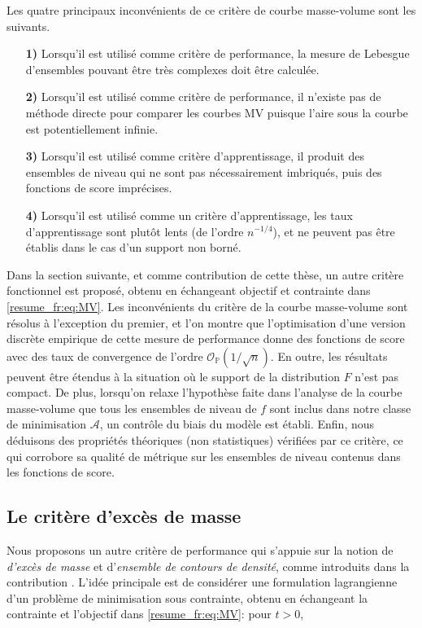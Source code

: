 \documentclass[a4paper, 12pt]{article}
\begin{document}
Les quatre principaux inconvénients de ce critère de courbe masse-volume sont les suivants.

\begin{itemize}
\item[\textbf{1)}] Lorsqu'il est utilisé comme critère de performance, la mesure de Lebesgue d'ensembles pouvant être très complexes doit être calculée.
\item[\textbf{2)}] Lorsqu'il est utilisé comme critère de performance, il n'existe pas de méthode directe pour comparer les courbes MV puisque l'aire sous la courbe est potentiellement infinie.
\item[\textbf{3)}] Lorsqu'il est utilisé comme critère d'apprentissage, il produit des ensembles de niveau qui ne sont pas nécessairement imbriqués, puis des fonctions de score imprécises.
\item[\textbf{4)}] Lorsqu'il est utilisé comme un critère d'apprentissage, les taux d'apprentissage sont plutôt lents (de l'ordre $ n ^ {- 1/4} $), et ne peuvent pas être établis dans le cas d'un support non borné.
\end{itemize}




Dans la section suivante, et comme contribution de cette thèse, un autre critère fonctionnel est proposé, obtenu en échangeant objectif et contrainte dans \eqref{resume_fr:eq:MV}. Les inconvénients du critère de la courbe masse-volume sont résolus à l'exception du premier, et l'on montre que l'optimisation d'une version discrète empirique de cette mesure de performance donne des fonctions de score avec des taux de convergence de l'ordre $ \mathcal {O} _ {\mathbb {P}} (1 / \sqrt {n}) $. En outre, les résultats peuvent être étendus à la situation où le support de la distribution $ F $ n'est pas compact. De plus, lorsqu'on relaxe l'hypothèse faite dans l'analyse de la courbe masse-volume que tous les ensembles de niveau de $f$ sont inclus dans notre classe de minimisation $ \mathcal {A} $, un contrôle du biais du modèle est établi. Enfin, nous déduisons des propriétés théoriques (non statistiques) vérifiées par ce critère, ce qui corrobore sa qualité de métrique sur les ensembles de niveau contenus dans les fonctions de score.


\subsection{Le critère d'excès de masse}
\label{resume_fr:em-curve}
Nous proposons un autre critère de performance qui s'appuie sur la notion de \textit {d'excès de masse} et d'\textit{ensemble de contours de densité}, comme introduits dans la contribution \cite{Polonik95}. L'idée principale est de considérer une formulation lagrangienne d'un problème de minimisation sous contrainte, obtenu en échangeant la contrainte et l'objectif dans \eqref{resume_fr:eq:MV}: pour $ t> 0 $,
\end{document}
